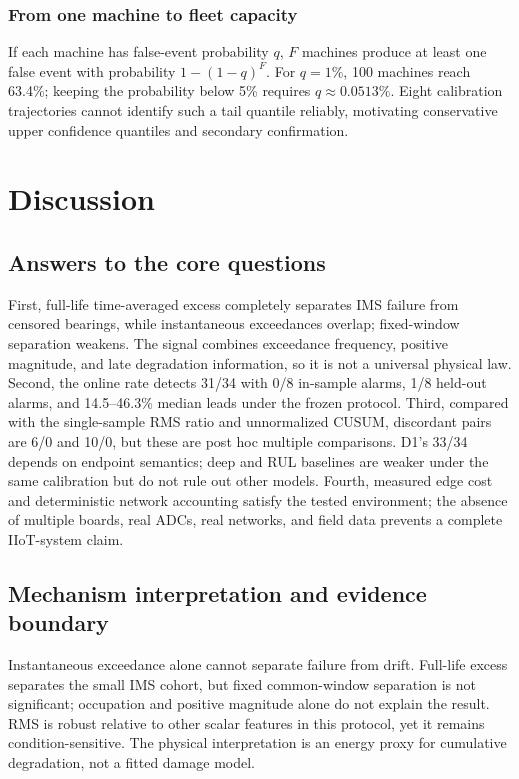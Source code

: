 \documentclass[journal]{IEEEtran}
\begin{document}
\subsubsection{From one machine to fleet capacity}
If each machine has false-event probability $q$, $F$ machines produce at least one false event with probability $1-(1-q)^F$. For $q=1\%$, 100 machines reach 63.4\%; keeping the probability below 5\% requires $q\approx0.0513\%$. Eight calibration trajectories cannot identify such a tail quantile reliably, motivating conservative upper confidence quantiles and secondary confirmation.

\section{Discussion}\label{sec:discussion}
\subsection{Answers to the core questions}
First, full-life time-averaged excess completely separates IMS failure from censored bearings, while instantaneous exceedances overlap; fixed-window separation weakens. The signal combines exceedance frequency, positive magnitude, and late degradation information, so it is not a universal physical law. Second, the online rate detects 31/34 with 0/8 in-sample alarms, 1/8 held-out alarms, and 14.5--46.3\% median leads under the frozen protocol. Third, compared with the single-sample RMS ratio and unnormalized CUSUM, discordant pairs are 6/0 and 10/0, but these are post hoc multiple comparisons. D1's 33/34 depends on endpoint semantics; deep and RUL baselines are weaker under the same calibration but do not rule out other models. Fourth, measured edge cost and deterministic network accounting satisfy the tested environment; the absence of multiple boards, real ADCs, real networks, and field data prevents a complete IIoT-system claim.

\subsection{Mechanism interpretation and evidence boundary}
Instantaneous exceedance alone cannot separate failure from drift. Full-life excess separates the small IMS cohort, but fixed common-window separation is not significant; occupation and positive magnitude alone do not explain the result. RMS is robust relative to other scalar features in this protocol, yet it remains condition-sensitive. The physical interpretation is an energy proxy for cumulative degradation, not a fitted damage model.
\end{document}
